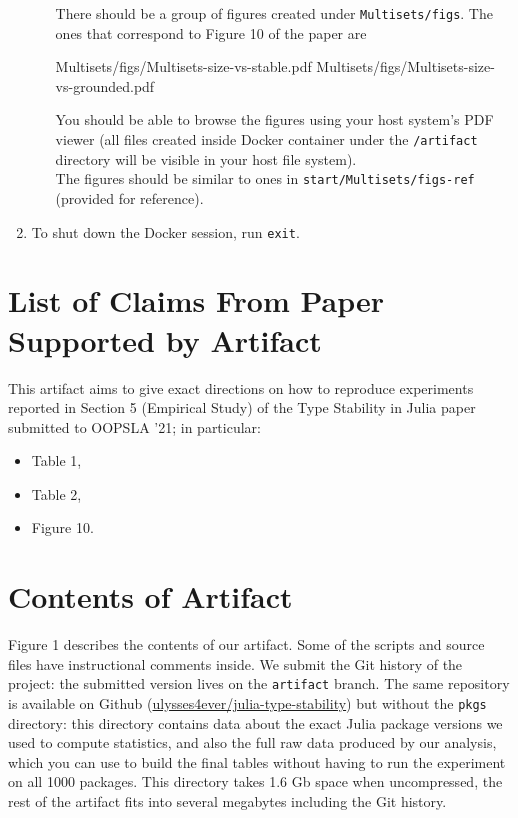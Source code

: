 \documentclass[
]{article}
\begin{document}
\begin{enumerate}
\begin{enumerate}
    There should be a group of figures created under
    \texttt{Multisets/figs}. The ones that correspond to Figure 10 of
    the paper are

\begin{verbnobox}[\small]
Multisets/figs/Multisets-size-vs-stable.pdf
Multisets/figs/Multisets-size-vs-grounded.pdf
\end{verbnobox}

    You should be able to browse the figures using your host system's
    PDF viewer (all files created inside Docker container under the
    \texttt{/artifact} directory will be visible in your host file
    system).\\
    The figures should be similar to ones in
    \texttt{start/Multisets/figs-ref} (provided for reference).
  \end{enumerate}
\item
  To shut down the Docker session, run \texttt{exit}.
\end{enumerate}

\hypertarget{list-of-claims-from-paper-supported-by-artifact}{%
\section{List of Claims From Paper Supported by
Artifact}\label{list-of-claims-from-paper-supported-by-artifact}}

This artifact aims to give exact directions on how to reproduce experiments reported in
Section 5 (Empirical Study) of the Type Stability in Julia paper
submitted to OOPSLA '21; in particular:
  \begin{itemize}
  \item
    Table 1,
  \item
    Table 2,
  \item
    Figure 10.
  \end{itemize}

\section{Contents of Artifact}

Figure 1 describes the contents of our artifact. Some of the scripts and source files
have instructional comments inside. We submit the Git history of the project:
the submitted version lives on the \texttt{artifact} branch. The same repository
is available on Github
({\color{blue}\href{https://github.com/ulysses4ever/julia-type-stability}{ulysses4ever/julia-type-stability}})
but without the \texttt{pkgs} directory: this directory contains data
about the exact Julia package versions we used to compute statistics, and also
the full raw data produced by our analysis, which you can use to build the final
tables without having to run the experiment on all 1000 packages. This directory
takes 1.6 Gb space when uncompressed, the rest of the artifact fits into several
megabytes including the Git history.
\end{document}
